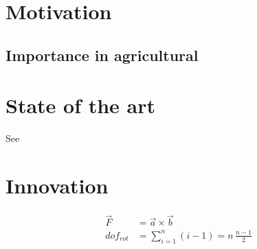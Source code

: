 

\lipsum[1]


\section{Motivation} %
\label{sec:motivation}

\lipsum[5-6]

\subsection{Importance in agricultural}
\lipsum[7]


\section{State of the art} %
\label{sec:state_of_the_art}

\lipsum[47]

See \cite{KJ:2016}




\section{Innovation} %
\label{sec:innovation}

\lipsum[2]

\begin{align}
  \vec F &= \vec a \times \vec b\\
  {dof}_{rot} &= \sum_{i=1}^n (i-1) = n\, \frac{n-1}{2}
\end{align}

\lipsum[7-13]
\lipsum[14-20]

